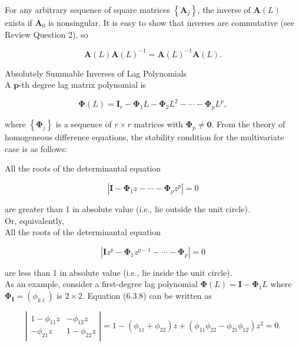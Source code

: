 \documentclass[10pt]{article}
\begin{document}
For any arbitrary sequence of square matrices $\left\{\mathbf{A}_{j}\right\}$, the inverse of $\mathbf{A}(L)$ exists if $\mathbf{A}_{0}$ is nonsingular. It is easy to show that inverses are commutative (see Review Question 2), so

$$
\mathbf{A}(L) \mathbf{A}(L)^{-1}=\mathbf{A}(L)^{-1} \mathbf{A}(L) .
$$

Absolutely Summable Inverses of Lag Polynomials\\
A $\boldsymbol{p}$-th degree lag matrix polynomial is


\begin{equation*}
\boldsymbol{\Phi}(L)=\mathbf{I}_{r}-\boldsymbol{\Phi}_{1} L-\boldsymbol{\Phi}_{2} L^{2}-\cdots-\boldsymbol{\Phi}_{p} L^{p}, \tag{6.3.7}
\end{equation*}


where $\left\{\boldsymbol{\Phi}_{j}\right\}$ is a sequence of $r \times r$ matrices with $\boldsymbol{\Phi}_{p} \neq \mathbf{0}$. From the theory of homogeneous difference equations, the stability condition for the multivariate case is as follows:

All the roots of the determinantal equation


\begin{equation*}
\left|\mathbf{I}-\boldsymbol{\Phi}_{1} z-\cdots-\boldsymbol{\Phi}_{p} z^{p}\right|=0 \tag{6.3.8}
\end{equation*}


are greater than 1 in absolute value (i.e., lie outside the unit circle).\\
Or, equivalently,\\
All the roots of the determinantal equation


\begin{equation*}
\left|\mathbf{I} z^{p}-\boldsymbol{\Phi}_{1} z^{p-1}-\cdots-\boldsymbol{\Phi}_{p}\right|=0 \tag{$\prime$}
\end{equation*}


are less than 1 in absolute value (i.e., lie inside the unit circle).\\
As an example, consider a first-degree lag polynomial $\boldsymbol{\Phi}(L)=\mathbf{I}-\boldsymbol{\Phi}_{1} L$ where $\boldsymbol{\Phi}_{\mathbf{I}}=\left(\phi_{k \ell}\right)$ is $2 \times 2$. Equation (6.3.8) can be written as

$$
\left|\begin{array}{cc}
1-\phi_{11} z & -\phi_{12} z \\
-\phi_{21} z & 1-\phi_{22} z
\end{array}\right|=1-\left(\phi_{11}+\phi_{22}\right) z+\left(\phi_{11} \phi_{22}-\phi_{21} \phi_{12}\right) z^{2}=0 .
$$
\end{document}
